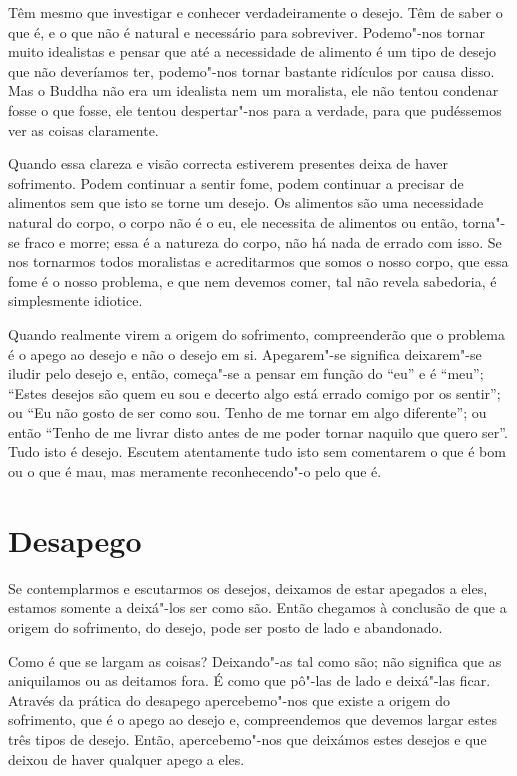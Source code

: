 Têm mesmo que investigar e conhecer verdadeiramente o desejo. Têm de saber o que
é, e o que não é natural e necessário para sobreviver. Podemo"-nos tornar muito
idealistas e pensar que até a necessidade de alimento é um tipo de desejo que
não deveríamos ter, podemo"-nos tornar bastante ridículos por causa disso. Mas o
Buddha não era um idealista nem um moralista, ele não tentou condenar fosse o
que fosse, ele tentou despertar"-nos para a verdade, para que pudéssemos ver as
coisas claramente.

Quando essa clareza e visão correcta estiverem presentes deixa de haver
sofrimento. Podem continuar a sentir fome, podem continuar a precisar de
alimentos sem que isto se torne um desejo. Os alimentos são uma necessidade
natural do corpo, o corpo não é o eu, ele necessita de alimentos ou então,
torna"-se fraco e morre; essa é a natureza do corpo, não há nada de errado com
isso. Se nos tornarmos todos moralistas e acreditarmos que somos o nosso corpo,
que essa fome é o nosso problema, e que nem devemos comer, tal não revela
sabedoria, é simplesmente idiotice.

Quando realmente virem a origem do sofrimento, compreenderão que o problema é o
apego ao desejo e não o desejo em si. Apegarem"-se significa deixarem"-se iludir
pelo desejo e, então, começa"-se a pensar em função do “eu” e é “meu”; “Estes
desejos são quem eu sou e decerto algo está errado comigo por os sentir”; ou “Eu
não gosto de ser como sou. Tenho de me tornar em algo diferente”; ou então
“Tenho de me livrar disto antes de me poder tornar naquilo que quero ser”. Tudo
isto é desejo. Escutem atentamente tudo isto sem comentarem o que é bom ou o que
é mau, mas meramente reconhecendo"-o pelo que é.

\section{Desapego}

Se contemplarmos e escutarmos os desejos, deixamos de estar apegados a eles,
estamos somente a deixá"-los ser como são. Então chegamos à conclusão de que a
origem do sofrimento, do desejo, pode ser posto de lado e abandonado.

Como é que se largam as coisas? Deixando"-as tal como são; não significa que as
aniquilamos ou as deitamos fora. É como que pô"-las de lado e deixá"-las ficar.
Através da prática do desapego apercebemo"-nos que existe a origem do sofrimento,
que é o apego ao desejo e, compreendemos que devemos largar estes três tipos de
desejo. Então, apercebemo"-nos que deixámos estes desejos e que deixou de haver
qualquer apego a eles.

